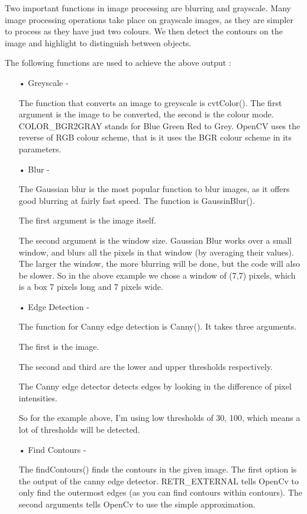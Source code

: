 \documentclass[14pt,a4paper]{article}
\begin{document}
\par Two important functions in image processing are blurring and grayscale. Many image processing operations take place on grayscale images, as they are simpler to process as they have just two colours. We then detect the contours on the image and highlight to distinguish between objects.
\par The following functions are used to achieve the above output : 
\begin{enumerate}
\item[•] Greyscale - 
\par The function that converts an image to greyscale is cvtColor(). The first argument is the image to be converted, the second is the colour mode. COLOR\_BGR2GRAY stands  for Blue Green Red to Grey.
OpenCV uses the reverse of RGB colour scheme, that is it uses the BGR colour scheme in its parameters.
\item[•] Blur - 
\par The Gaussian blur is the most popular function to blur images, as it offers good blurring at fairly fast speed. The function is GaussinBlur().
\par The first argument is the image itself.
\par The second argument is the window size. Gaussian Blur works over a small window, and blurs all the pixels in that window (by averaging their values). The larger the window, the more blurring will be done, but the code will also be slower. So in the above example we chose a window of (7,7) pixels, which is a box 7 pixels long and 7 pixels wide.
\item[•] Edge Detection - 
\par The function for Canny edge detection is Canny(). It takes three  arguments.
\par The first is the image.
\par The second and third are the lower and upper thresholds respectively.
\par The Canny edge detector detects edges by looking in the difference of pixel intensities.
\par So for the example above, I’m using low thresholds of 30, 100, which means a lot of thresholds will be detected.
\item[•] Find Contours - 
\par The findContours() finds the contours in the given image. The first option is the output of the canny edge detector. RETR\_EXTERNAL tells OpenCv to only find the outermost edges (as you can find contours within contours). The second arguments tells OpenCv to use the simple approximation.

\end{enumerate}
\end{document}

